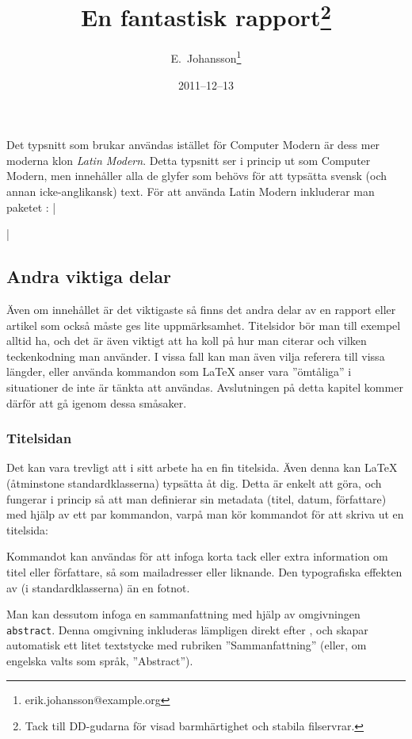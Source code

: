 \documentclass[../../latex.tex]{subfiles}
\begin{document}
Det typsnitt som brukar användas istället för Computer Modern är dess
mer moderna klon \emph{Latin Modern}. Detta typsnitt ser
i princip ut som Computer Modern, men innehåller alla de glyfer som behövs
för att typsätta svensk (och annan icke-anglikansk) text. För att använda
Latin Modern inkluderar man paketet :
\latex|\usepackage{lmodern}|

\subsection{Andra viktiga delar}
Även om innehållet är det viktigaste så finns det andra delar av en
rapport eller artikel som också måste ges lite uppmärksamhet.
Titelsidor bör man till exempel alltid ha, och det är även viktigt att ha 
koll på
hur man citerar och vilken teckenkodning man använder. I vissa fall
kan man även vilja referera till vissa längder, eller använda kommandon
som \LaTeX{} anser vara ”ömtåliga” i situationer de inte är tänkta att
användas. Avslutningen på detta kapitel kommer därför att gå igenom dessa
småsaker.

\subsubsection{Titelsidan}%
Det kan vara trevligt att i sitt arbete ha en fin titelsida. Även denna
kan \LaTeX{} (åtminstone standardklasserna) typsätta åt dig. Detta är
enkelt att göra, och fungerar i princip så att man definierar sin
metadata (titel, datum, författare) med hjälp av ett par kommandon, varpå
man kör kommandot  för att skriva ut en titelsida:
\begin{latexcode}
\title{En fantastisk rapport\thanks{Tack till DD-gudarna
   för visad barmhärtighet och stabila filservrar.}}
\date{2011--12--13}
\author{E.~Johansson\thanks{erik.johansson@example.org}}
\maketitle
\end{latexcode}

Kommandot  kan användas för att infoga korta tack eller extra
information om titel eller författare, så som mailadresser eller
liknande. Den typografiska effekten av  (i standardklasserna)
än en fotnot.

Man kan dessutom infoga en sammanfattning  med hjälp av
omgivningen \texttt{abstract}. Denna omgivning inkluderas lämpligen direkt
efter , och skapar automatisk ett litet textstycke med
rubriken ”Sammanfattning” (eller, om engelska valts som språk,
”Abstract”).
\end{document}
